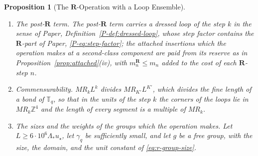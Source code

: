 \documentclass[11pt]{preprint}
\numberwithin{equation}{section}
\newtheorem{proposition}{Proposition}
\theoremstyle{definition}
\theoremstyle{remark}
\theoremstyle{plain}
\begin{document}
\begin{proposition}[The $\mathbf R$-Operation with a Loop Ensemble]
\begin{enumerate}[label=(\roman*)]
\begin{equation}\label{eq:r-cross-production}
    C^{\mathbf R}_{\mathrm{cr}}P_k(\mathcal C)\,e^{-p_0(g_k)/4}e^{-\kappa d_k/(6MR_k)}\;,
\end{equation}
with $d_k$ the least distance between two loops in the units of the step $k$ and a constant $C^{\mathbf R}_{\mathrm{cr}}$ of $d$, $\kappa$, $\beta$, and the representations. A cross group which contains an insertion of the cross species belongs to the species of the first such insertion $W$, and the groups assigned to $W$ have total mass at most $y^{\mathbf R}_k$ times that of $W$, with $y^{\mathbf R}_k \coloneqq C_ye^{-p_0(g_k)/4}$ and $\prod_k(1 + y^{\mathbf R}_k) \leq 2$, the product over the $\mathbf R$-steps $k \leq K'$. A group on one loop one of whose members wraps around the torus is of the wrapping species, it is counted with its first such member, and the groups assigned to a member add at most $y^{\mathbf R}_k$ times its mass. The groups of the deviation species which the operation makes are those of (viii)(e). The constant of their tail clause is at most $C^{\mathbf R}(g_k)$, with
\begin{equation}\label{eq:r-source}
    C^{\mathbf R}(g) \coloneqq \exp\Bigl(-\frac14A_0(\log g^{-2})^{p_0} + \log g^{-2} + C\log\log g^{-2}\Bigr)\;,
\end{equation}
so that at an $\mathbf R$-step the recursion of Paper, \eqref{P-eq:deviation-recursion}, holds with $C_{\mathrm{new}} + C^{\mathbf R}(g_k)$ in the place of $C_{\mathrm{new}}$ and with the same $a$.
\item \emph{The post-$\mathbf R$ term.} The post-$\mathbf R$ term carries a dressed loop of the step $k$ in the sense of Paper, Definition~\ref{P-def:dressed-loop}, whose step factor contains the $\mathbf R$-part of Paper, \eqref{P-eq:step-factor}; the attached insertions which the operation makes at a second-class component are paid from its reserve as in Proposition~\ref{prop:attached}(iv), with $m^{\mathbf R}_n \leq m_n$ added to the cost of each $\mathbf R$-step $n$.
\item \emph{Commensurability.} $MR_kL^k$ divides $MR_{K'}L^{K'}$, which divides the fine length of a bond of $\mathbb T_q$, so that in the units of the step $k$ the corners of the loops lie in $MR_k\mathbb Z^4$ and the length of every segment is a multiple of $MR_k$.
\item \emph{The sizes and the weights of the groups which the operation makes.} Let $L \geq 6 \cdot 10^6\Lambda_*u_\star$, let $\gamma_q$ be sufficiently small, and let $g$ be a free group, with the size, the domain, and the unit constant of \eqref{eq:r-group-size}.

\end{enumerate}
\end{proposition}
\end{document}
